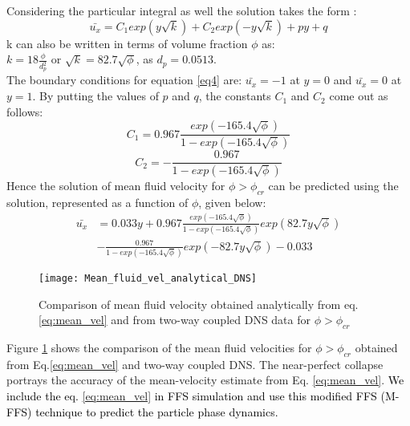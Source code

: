 \documentclass[notitlepage]{revtex4-1}
\begin{document}
    Considering the particular integral as well the solution takes the form :
    \begin{equation}
        \bar{u_x}=C_1 exp(y\sqrt{k})+C_2 exp(-y\sqrt{k})+py+q
        \label{eq4}
    \end{equation}
    k can also be written in terms of volume fraction $\phi$ as: \\
    \begin{math}
    k=18\frac{\phi}{d_p^2}
    \end{math} or $\sqrt{k}=82.7\sqrt{\phi}$, as $d_p=0.0513$.
   \\ The boundary conditions for equation \ref{eq4} are:
    $\bar{u_x}=-1$ at $y=0$ and $\bar{u_x}=0$ at $y=1$.
    By putting the values of $p$ and $q$, the constants $C_1$ and $C_2$ come out as follows:
    \begin{equation}
    C_1=0.967\frac{exp(-165.4\sqrt{\phi})}{1-exp(-165.4\sqrt{\phi})}
    \end{equation}
    \begin{equation}
    C_2=-\frac{0.967}{1-exp(-165.4\sqrt{\phi})}    
    \end{equation}
    Hence the solution of mean fluid velocity for $\phi>\phi_{cr}$ can be predicted using the solution, represented as a function of $\phi$, given below:
    \begin{eqnarray}
     \bar{u_x}&=0.033y +0.967\frac{exp(-165.4\sqrt{\phi})}{1-exp(-165.4\sqrt{\phi})}exp(82.7y\sqrt{\phi})\\&-\frac{0.967}{1-exp(-165.4\sqrt{\phi})}exp(-82.7y\sqrt{\phi})-0.033
     \label{eq:mean_vel}
    \end{eqnarray}
    \begin{figure}
        \centering
        \texttt{[image: Mean\_fluid\_vel\_analytical\_DNS]}
        \caption{Comparison of mean fluid velocity obtained analytically from eq.\ref{eq:mean_vel} and from two-way coupled DNS data for $\phi>\phi_{cr}$}
        \label{fig:DNS_analytical}
    \end{figure}
    Figure \ref{fig:DNS_analytical} shows the comparison of the mean fluid velocities for $\phi>\phi_{cr}$ obtained from Eq.\ref{eq:mean_vel} and two-way coupled DNS. The near-perfect collapse portrays the accuracy of the mean-velocity estimate from Eq. \ref{eq:mean_vel}. \textcolor{black}{We include the eq. \ref{eq:mean_vel} in FFS simulation and use this modified FFS (M-FFS) technique to predict the particle phase dynamics.}     
\end{document}
